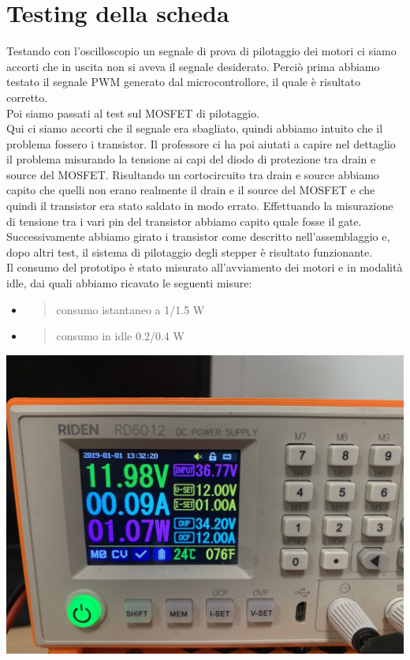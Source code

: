 \chapter{Testing della scheda}

Testando con l’oscilloscopio un segnale di prova di pilotaggio dei motori ci 
siamo accorti che in uscita non si aveva il segnale desiderato. 
Perciò prima abbiamo testato il segnale PWM generato dal microcontrollore, 
il quale è risultato corretto.\\
Poi siamo passati al test sul MOSFET di pilotaggio.\\
Qui ci siamo accorti che il segnale era sbagliato, quindi abbiamo intuito che il problema fossero i transistor.
Il professore ci ha poi aiutati a capire nel dettaglio il problema misurando la tensione ai capi del diodo di
protezione tra drain e source del MOSFET. Risultando un cortocircuito tra drain e source abbiamo capito che 
quelli non erano realmente il drain e il source del MOSFET e che quindi il transistor era stato saldato in 
modo errato. Effettuando la misurazione di tensione tra i vari pin del transistor abbiamo capito quale fosse il gate.
Successivamente abbiamo girato i transistor come descritto nell’assemblaggio e, dopo altri test, il sistema di pilotaggio
degli stepper è risultato funzionante.\\

Il consumo del prototipo è stato misurato all’avviamento dei motori e in modalità idle, dai quali abbiamo ricavato le seguenti misure:
\begin{itemize}
\item
    \begin{quote}
    consumo istantaneo a 1/1.5 W
    \end{quote}
\item
    \begin{quote}
    consumo in idle 0.2/0.4 W
    \end{quote}
\end{itemize}


\begin{center}
\includegraphics[scale=0.3]{figures/image3.png}
\captionsetup{type=figure}
\end{center}

